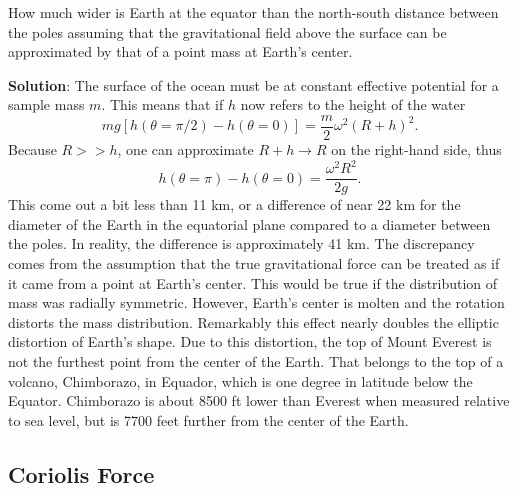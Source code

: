 \example
How much wider is Earth at the equator than the north-south distance between the poles assuming that the gravitational field above the surface can be approximated by that of a point mass at Earth's center.

{\bf Solution}: 
The surface of the ocean must be at constant effective potential for a sample mass $m$. This means that if $h$ now refers to the height of the water
\[
m g[h(\theta=\pi/2)-h(\theta=0)]=\frac{m}{2}\omega^2(R+h)^2.
\]
Because $R>>h$, one can approximate $R+h\rightarrow R$ on the right-hand side, thus
\[
h(\theta=\pi)-h(\theta=0)=\frac{\omega^2R^2}{2g}.
\]
This come out a bit less than 11 km, or a difference of near 22 km for the diameter of the Earth in the equatorial plane compared to a diameter between the poles. In reality, the difference is approximately 41 km. The discrepancy comes from the assumption that the true gravitational force can be treated as if it came from a point at Earth's center. This would be true if the distribution of mass was radially symmetric. However, Earth's center is molten and the rotation distorts the mass distribution. Remarkably this effect nearly doubles the elliptic distortion of Earth's shape. Due to this distortion, the top of Mount Everest is not the furthest point from the center of the Earth. That belongs to the top of a volcano, Chimborazo, in Equador, which is one degree in latitude below the Equator. Chimborazo is about 8500 ft lower than Everest when measured relative to sea level, but is 7700 feet further from the center of the Earth.

\exampleend

\subsection{Coriolis Force}

